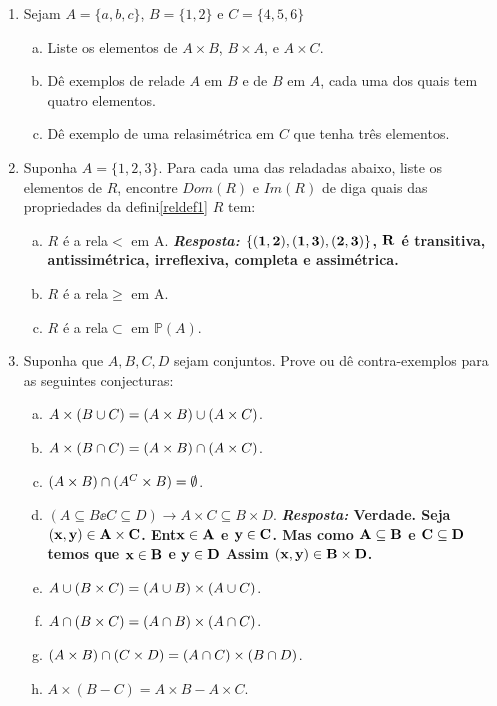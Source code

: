 \begin{enumerate}[{\bf 1.}]
\item Sejam $A=\{a,b,c\}$, $B=\{1,2\}$ e $C=\{4,5,6\}$
\begin{enumerate}[a)]
\item Liste os elementos de $A\times B$, $B\times A$, e $A\times C$.
\item D\^e exemplos de rela\coes de $A$ em $B$ e de $B$ em $A$, cada uma dos quais tem quatro elementos.
\item D\^e exemplo de uma rela\cao sim\'etrica em $C$ que tenha tr\^es elementos.
\end{enumerate}

\item Suponha $A=\{1,2,3\}$. Para cada uma das rela\coes dadas abaixo, liste os elementos de $R$, encontre $Dom(R)$ e $Im(R)$ de diga quais das propriedades da defini\cao \ref{reldef1} $R$ tem:
\begin{enumerate}[a)]
\item $R$ \'e a rela\cao $<$ em A. {\bf{\it Resposta:} ${\bf \{(1,2),(1,3),(2,3)\}}$, ${\bf R}$ \'e transitiva, antissim\'etrica, irreflexiva, completa e assim\'etrica.}
\item $R$ \'e a rela\cao $\geq$ em A.
\item $R$ \'e a rela\cao $\subset$ em $\mathbb{P}(A)$.
\end{enumerate}

\item Suponha que $A,B,C,D$ sejam conjuntos. Prove ou d\^e contra-exemplos para as seguintes conjecturas:
\begin{enumerate}[a)]
\item $A\times(B\cup C)= (A\times B)\cup(A\times C)$.
\item $A\times(B\cap C)=(A\times B)\cap(A\times C)$.
\item $(A\times B)\cap(A^C\times B)=\emptyset$.
\item $(A\subseteq B\ee C\subseteq D)\to A\times C\subseteq B\times D$. {\bf{\it Resposta:} Verdade. Seja ${\bf (x,y)\in A\times C}$. Ent\ao ${\bf x\in A}$ e ${\bf y\in C}$. Mas como ${\bf A\subseteq B}$ e ${\bf C\subseteq D}$ temos que ${\bf x\in B}$ e ${\bf y\in D}$ Assim ${\bf (x,y)\in B\times D}$.}
\item $A\cup(B\times C)=(A\cup B)\times(A\cup C)$.
\item $A\cap(B\times C)=(A\cap B)\times(A\cap C)$.
\item $(A\times B)\cap(C\times D)=(A\cap C)\times(B\cap D)$.
\item $A\times(B-C)=A\times B-A\times C$.
\end{enumerate}


\end{enumerate}
